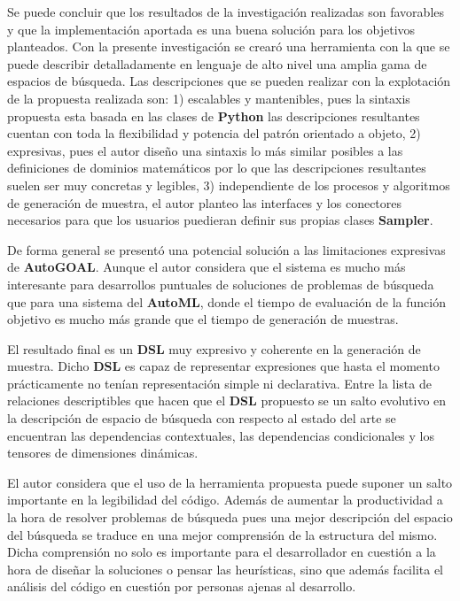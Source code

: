 \begin{conclusions}
      Se puede concluir que los resultados de la investigación realizadas son favorables
      y que la implementación aportada es una buena solución para los objetivos planteados.
      Con la presente investigación se crearó una herramienta con la que se puede describir
      detalladamente en lenguaje de alto nivel una amplia gama de espacios de búsqueda.
      Las descripciones que se pueden realizar con la explotación de la propuesta realizada
      son: 1) escalables y mantenibles, pues la sintaxis propuesta esta basada en las
      clases de {\bf Python} las descripciones resultantes cuentan con toda la flexibilidad y potencia
      del patrón orientado a objeto, 2) expresivas, pues el autor diseño una sintaxis lo más
      similar posibles a las definiciones de dominios matemáticos por lo que las descripciones resultantes suelen
      ser muy concretas y legibles, 3) independiente de los procesos y algoritmos de generación de
      muestra, el autor planteo las interfaces y los conectores necesarios para que los usuarios
      puedieran definir sus propias clases {\bf Sampler}.

      De forma general se presentó una potencial solución a las limitaciones expresivas de {\bf AutoGOAL}.
      Aunque el autor considera que el sistema es mucho más interesante para desarrollos puntuales de
      soluciones de problemas de búsqueda que para una sistema del {\bf AutoML}, donde el tiempo de evaluación
      de la función objetivo es mucho más grande que el tiempo de generación de muestras.

      El resultado final es un {\bf DSL} muy expresivo y coherente en la generación de muestra. Dicho {\bf DSL} es
      capaz de representar expresiones que hasta el momento prácticamente no tenían representación simple
      ni declarativa. Entre la lista de relaciones descriptibles que hacen que el {\bf DSL} propuesto se un
      salto evolutivo en la descripción de espacio de búsqueda con respecto al estado del arte se
      encuentran las dependencias contextuales, las dependencias condicionales y los tensores de
      dimensiones dinámicas.

      El autor considera que el uso de la herramienta propuesta puede suponer un salto importante en la
      legibilidad del código. Además de aumentar la productividad a la hora de resolver problemas de
      búsqueda pues una mejor descripción del espacio del búsqueda se traduce en una mejor comprensión
      de la estructura del mismo. Dicha comprensión no solo es importante para el desarrollador en
      cuestión a la hora de diseñar la soluciones o pensar las heurísticas, sino que además facilita
      el análisis del código en cuestión por personas ajenas al desarrollo.
\end{conclusions}
